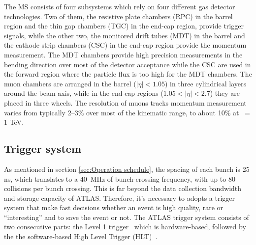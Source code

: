 The MS consists of four subsystems which rely on four different gas detector
technologies. Two of them, the resistive plate chambers (RPC) in the barrel region 
and the thin gap chambers (TGC) in the end-cap region, provide trigger signals, 
while the other two, the monitored drift tubes (MDT) in the barrel and the cathode strip 
chambers (CSC) in the end-cap region provide the momentum measurement. 
The MDT chambers provide high precision measurements in the bending direction over most of the detector
acceptance while the CSC are used in the forward region where the particle flux 
is too high for the MDT	chambers. The muon chambers are arranged in the barrel 
($|\eta| < 1.05$) in three cylindrical layers around the beam axis, 
while in the end-cap regions ($1.05 < |\eta| < 2.7$) they are placed in three wheels.
The resolution of muons tracks momentum measurement varies from typically 2–3\% over
most of the kinematic range, to about 10\% at \pt\ = 1 TeV.  

\subsection{Trigger system}
\label{sec:ATLAS:trigger}
As mentioned in section \ref{sec:Operation schedule}, the spacing of each bunch
is 25 ns, which translates to a 40~MHz of bunch-crossing frequency, with up to 80
collisions per bunch crossing. This is far beyond the data collection bandwidth and 
storage capacity of ATLAS. 
Therefore, it's necessary to adopts a trigger system that make fast decisions
whether an event is high quality, rare or ``interesting'' and to save the event or not.
The ATLAS trigger system consists of two consecutive parts: the Level 1 trigger~\cite{ATLAS-TDR-12}
which is hardware-based, 
followed by the the software-based High Level Trigger (HLT)~\cite{ATLAS-TDR-16}.

